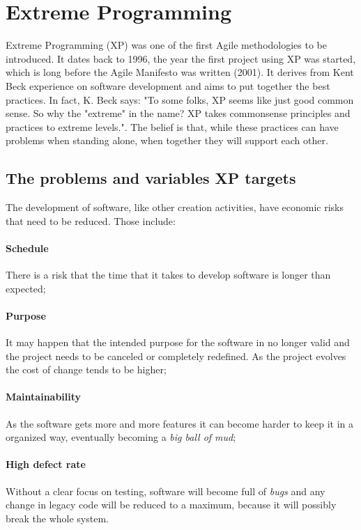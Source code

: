 \documentclass[conference]{IEEEtran}
\begin{document}
\section{Extreme Programming}
Extreme Programming (XP) was one of the first Agile methodologies to be introduced. It dates back to 1996, the year the first project using XP was started\cite{Wells:2IqWBPJS}, which is long before the Agile Manifesto was written (2001)\cite{Martin:2006vx}. It derives from Kent Beck experience on software development and aims to put together the best practices. In fact, K. Beck says: "To some folks, XP seems like just good common sense. So why the "extreme" in the name? XP takes commonsense principles and practices to extreme levels."\cite{Beck:2004tc}. The belief is that, while these practices can have problems when standing alone, when together they will support each other.

\subsection{The problems and variables XP targets}
The development of software, like other creation activities, have economic risks that need to be reduced. Those include:
\paragraph{Schedule} There is a risk that the time that it takes to develop software is longer than expected;
\paragraph{Purpose} It may happen that the intended purpose for the software in no longer valid and the project needs to be canceled or completely redefined. As the project evolves the cost of change tends to be higher;
\paragraph{Maintainability} As the software gets more and more features it can become harder to keep it in a organized way, eventually becoming a \textit{big ball of mud}\cite{bigballofmud};
\paragraph{High defect rate} Without a clear focus on testing, software will become full of \textit{bugs} and any change in legacy code will be reduced to a maximum, because it will possibly break the whole system.
\end{document}
